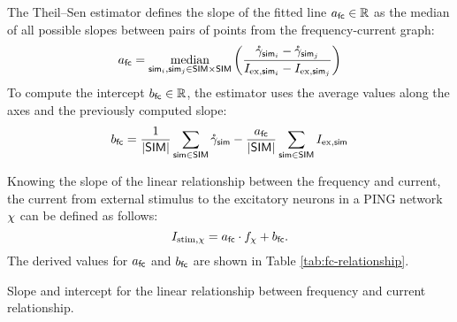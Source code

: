 The Theil–Sen estimator defines the slope of the fitted line $a_\mathsf{fc} \in \mathbb{R}$ as the median of all possible slopes between pairs of points from the frequency-current graph:
\begin{equation}
    a_\mathsf{fc} = \operatorname*{median}_{
        \mathsf{sim}_i, \mathsf{sim}_j \in \mathsf{SIM} \times \mathsf{SIM}
    } \left( 
        \frac{
            \mathring{\gamma}_{\mathsf{sim}_i} - \mathring{\gamma}_{\mathsf{sim}_j}
        }{
            I_{\mathrm{ex}, \mathsf{sim}_i} - I_{\mathrm{ex}, \mathsf{sim}_j}
        } 
    \right)
\end{equation}
To compute the intercept $b_\mathsf{fc} \in \mathbb{R}$, the estimator uses the average values along the axes and the previously computed slope:
\begin{equation}
    b_\mathsf{fc} = 
    \frac{1}{|\mathsf{SIM}|}
    \sum_{\mathsf{sim} \in \mathsf{SIM}}
    \mathring{\gamma}_{\mathsf{sim}}
    -
    \frac{a_\mathsf{fc}}{|\mathsf{SIM}|}
    \sum_{\mathsf{sim} \in \mathsf{SIM}}
    I_{\mathrm{ex}, \mathsf{sim}}
\end{equation}

Knowing the slope of the linear relationship between the frequency and current, the current from external stimulus to the excitatory neurons in a PING network $\chi$ can be defined as follows:
\begin{equation}
    I_{\mathrm{stim}, \chi} = a_\mathsf{fc} \cdot f_\chi + b_\mathsf{fc}.
\end{equation}
The derived values for $a_\mathsf{fc}$ and $b_\mathsf{fc}$ are shown in Table \ref{tab:fc-relationship}.
\begin{table}[!htp]
    \centering
    
    \caption[Frequency-current relationship parameters]{Slope and intercept for the linear relationship between frequency and current relationship.}
    \label{tab:fc-relationship}
\end{table}